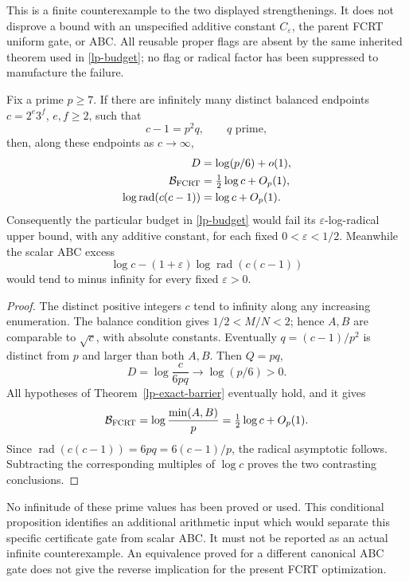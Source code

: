 This is a finite counterexample to the two displayed strengthenings.
It does not disprove a bound with an unspecified additive constant
\(C_\varepsilon\), the parent FCRT uniform gate, or ABC. All reusable
proper flags are absent by the same inherited theorem used in
\eqref{lp-budget}; no flag or radical factor has been suppressed to
manufacture the failure.

\begin{proposition}
\label{lp-conditional-infinite}
Fix a prime \(p\ge7\). If there are infinitely many distinct balanced
endpoints \(c=2^e3^f\), \(e,f\ge2\), such that
\[
 c-1=p^2q,\qquad q\text{ prime},
\]
then, along these endpoints as \(c\to\infty\),
\begin{align*}
 D&=\log(p/6)+o(1),\\
 \mathcal B_{\rm FCRT}&=\tfrac12\log c+O_p(1),\\
 \log\operatorname{rad}(c(c-1))&=\log c+O_p(1).
\end{align*}
Consequently the particular budget in \eqref{lp-budget} would fail
its \(\varepsilon\)-log-radical upper bound, with any additive constant,
for each fixed \(0<\varepsilon<1/2\). Meanwhile the scalar ABC excess
\[
 \log c-(1+\varepsilon)\log\operatorname{rad}(c(c-1))
\]
would tend to minus infinity for every fixed \(\varepsilon>0\).
\end{proposition}
\begin{proof}
The distinct positive integers \(c\) tend to infinity along any increasing
enumeration. The balance condition gives \(1/2<M/N<2\); hence \(A,B\)
are comparable to \(\sqrt c\), with absolute constants. Eventually
\(q=(c-1)/p^2\) is distinct from \(p\) and larger than both \(A,B\).
Then \(Q=pq\),
\[
 D=\log\frac{c}{6pq}\longrightarrow\log(p/6)>0.
\]
All hypotheses of Theorem~\ref{lp-exact-barrier} eventually hold, and
it gives
\[
 \mathcal B_{\rm FCRT}=\log\frac{\min(A,B)}p
       =\tfrac12\log c+O_p(1).
\]
Since \(\operatorname{rad}(c(c-1))=6pq=6(c-1)/p\), the radical
asymptotic follows. Subtracting the corresponding multiples of
\(\log c\) proves the two contrasting conclusions.
\end{proof}

No infinitude of these prime values has been proved or used. This
conditional proposition identifies an additional arithmetic input
which would separate this specific certificate gate from scalar ABC.
It must not be reported as an actual infinite counterexample. An
equivalence proved for a different canonical ABC gate does not give
the reverse implication for the present FCRT optimization.

